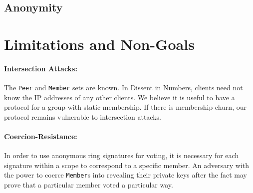 \subsection{Anonymity}


\section{Limitations and Non-Goals}
  \paragraph{Intersection Attacks:} The \texttt{Peer} and \texttt{Member} sets
  are known. In Dissent in Numbers, clients need not know the IP addresses of
  any other clients. We believe it is useful to have a protocol for a group with
  static membership.  If there is membership churn, our protocol remains
  vulnerable to intersection attacks.
  \paragraph{Coercion-Resistance:} In order to use anonymous ring signatures for
  voting, it is necessary for each signature within a scope to correspond to a
  specific member. An adversary with the power to coerce \texttt{Member}s into
  revealing their private keys after the fact may prove that a particular member
  voted a particular way\cite{lrs}.
